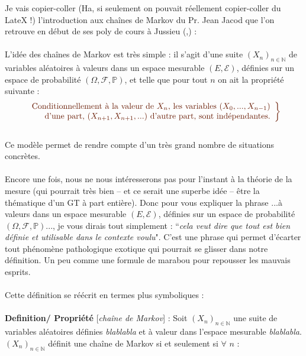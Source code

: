 \documentclass{article}
\begin{document}
Je vais copier-coller (Ha, si seulement on pouvait réellement copier-coller du LateX !) l'introduction aux cha\^ines de Markov du Pr. Jean Jacod que l'on retrouve en début de ses poly de cours à Jussieu (\cite{2},\cite{3}) :\\
\\
\textcolor{marron_noir}{L'idée des cha\^ines de Markov est très simple : il s'agit d'une suite $(X_n)_{n\in \mathbb{N}}$ de variables aléatoires à valeurs dans un espace mesurable $(E,\mathcal{E})$, définies sur un espace de probabilité $(\Omega,\mathcal{F},\mathbb{P})$, et telle que pour tout $n$ on ait la propriété suivante :}\\
\begin{equation}
\textcolor{marron_noir}{\left. \begin{array}{r}
\textcolor{marron_noir}{\text{Conditionnellement à la valeur de $X_n$, les variables $(X_0, ..., X_{n-1})$}}\\
\textcolor{marron_noir}{\text{d'une part, $(X_{n+1},X_{n+1},...)$ d'autre part, sont indépendantes.}}\\
\end{array}\right\rbrace}
\end{equation}
\\
\textcolor{marron_noir}{Ce modèle permet de rendre compte d'un très grand nombre de situations concrètes.}\\
\\
Encore une fois, nous ne nous intéresserons pas pour l'instant à la théorie de la mesure (qui pourrait très bien -- et ce serait une superbe idée -- être la thématique d'un GT à part entière). Donc pour vous expliquer la phrase \textcolor{marron_noir}{...à valeurs dans un espace mesurable $(E,\mathcal{E})$, définies sur un espace de probabilité $(\Omega,\mathcal{F},\mathbb{P})$...}, je vous dirais tout simplement : ``\textit{cela veut dire que tout est bien définie et utilisable dans le contexte voulu}". C'est une phrase qui permet d'écarter tout phénomène pathologique exotique qui pourrait se glisser dans notre définition. Un peu comme une formule de marabou \cite{4} pour repousser les mauvais esprits. \\
\\
Cette définition se réécrit en termes plus symboliques :\\
\\
\textbf{Definition/ Propriété} [\textit{cha\^ine de Markov}] : Soit $(X_n)_{n\in \mathbb{N}}$ une suite de variables aléatoires définies \textit{blablabla} et à valeur dans l'espace mesurable \textit{blablabla}. $(X_n)_{n\in \mathbb{N}}$ définit une cha\^ine de Markov si et seulement si $\forall$ $n$ :
\end{document}
